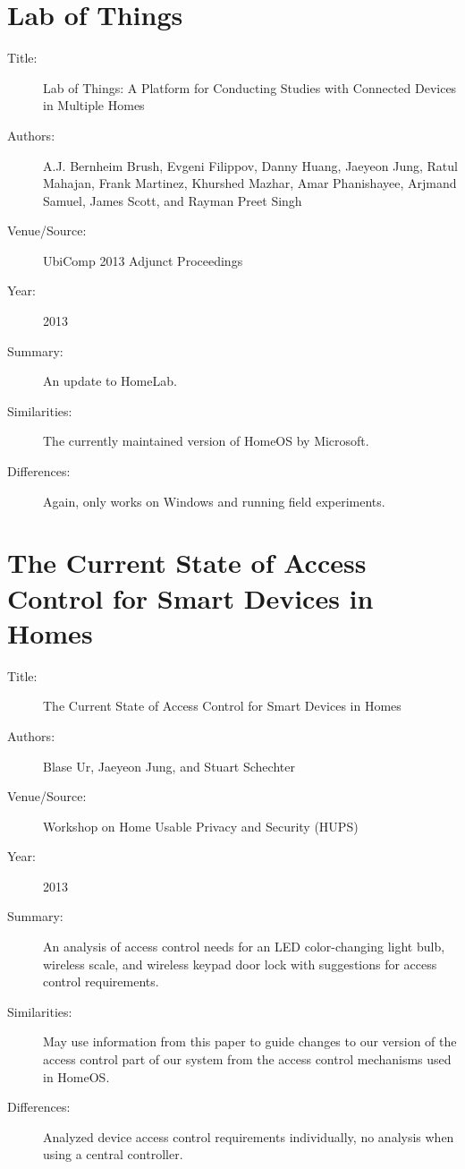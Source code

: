 \documentclass[letterpaper,12pt]{article}
\begin{document}
\section{Lab of Things~\cite{labOfThings}}
\begin{description}
 \item[Title:] Lab of Things: A Platform for Conducting Studies with Connected Devices in Multiple Homes
 \item[Authors:] A.J. Bernheim Brush, Evgeni Filippov, Danny Huang, Jaeyeon Jung, Ratul Mahajan, Frank Martinez, Khurshed Mazhar, Amar Phanishayee, Arjmand Samuel, James Scott, and Rayman Preet Singh
 \item[Venue/Source:] UbiComp 2013 Adjunct Proceedings
 \item[Year:] 2013
 \item[Summary:] An update to HomeLab.
 \item[Similarities:] The currently maintained version of HomeOS by Microsoft.
 \item[Differences:] Again, only works on Windows and running field experiments.
\end{description}

\section{The Current State of Access Control for Smart Devices in Homes~\cite{currentState}}
\begin{description}
 \item[Title:] The Current State of Access Control for Smart Devices in Homes
 \item[Authors:] Blase Ur, Jaeyeon Jung, and Stuart Schechter
 \item[Venue/Source:] Workshop on Home Usable Privacy and Security (HUPS)
 \item[Year:] 2013
 \item[Summary:] An analysis of access control needs for an LED color-changing light bulb, wireless scale, and wireless keypad door lock with suggestions for access control requirements.
 \item[Similarities:] May use information from this paper to guide changes to our version of the access control part of our system from the access control mechanisms used in HomeOS.
 \item[Differences:] Analyzed device access control requirements individually, no analysis when using a central controller.
\end{description}
\end{document}
